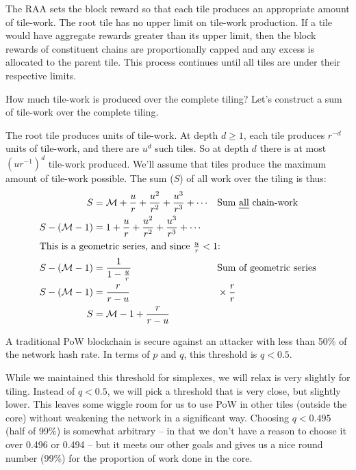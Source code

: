 The RAA sets the block reward so that each tile produces an appropriate amount of tile-work.
The root tile has no upper limit on tile-work production.
If a tile would have aggregate rewards greater than its upper limit, then the block rewards of constituent chains are proportionally capped and any excess is allocated to the parent tile.
This process continues until all tiles are under their respective limits.


\label{sec:total-work-over-tiling}


How much tile-work is produced over the complete tiling?
Let's construct a sum of tile-work over the complete tiling.

The root tile produces \Mroot units of tile-work.
At depth $d \ge 1$, each tile produces $r^{-d}$ units of tile-work, and there are $u^d$ such tiles.
So at depth $d$ there is at most $(ur^{-1})^d$ tile-work produced.
We'll assume that tiles produce the maximum amount of tile-work possible.
The sum ($S$) of all work over the tiling is thus:
\begin{align}
    S &= \mathcal{M} + \frac{u}{r} + \frac{u^2}{r^2} + \frac{u^3}{r^3} + \cdots && \text{Sum \emph{all} chain-work}
    \nonumber \\
    S - (\mathcal{M}-1) &= 1 + \frac{u}{r} + \frac{u^2}{r^2} + \frac{u^3}{r^3} + \cdots
    \nonumber \\
    \intertext{This is a geometric series, and since $\frac{u}{r} < 1$:}
    S - (\mathcal{M}-1) &= \frac{1}{1 - \frac{u}{r}} && \text{Sum of geometric series}
    \nonumber \\
    S - (\mathcal{M}-1) &= \frac{r}{r - u} && \times\frac{r}r
    \nonumber \\
    S &= \mathcal{M}-1 + \frac{r}{r - u}
    \label{eq:tree-tiling-total-work}
\end{align}


A traditional PoW blockchain is secure against an attacker with less than 50\% of the network hash rate.
In terms of $p$ and $q$, this threshold is $q < 0.5$.

While we maintained this threshold for simplexes, we will relax is very slightly for tiling.
Instead of $q < 0.5$, we will pick a threshold that is very close, but slightly lower.
This leaves some wiggle room for us to use PoW in other tiles (outside the core) without weakening the network in a significant way.
Choosing $q < 0.495$ (half of 99\%) is somewhat arbitrary -- in that we don't have a reason to choose it over 0.496 or 0.494 -- but it meets our other goals and gives us a nice round number (99\%) for the proportion of work done in the core.

